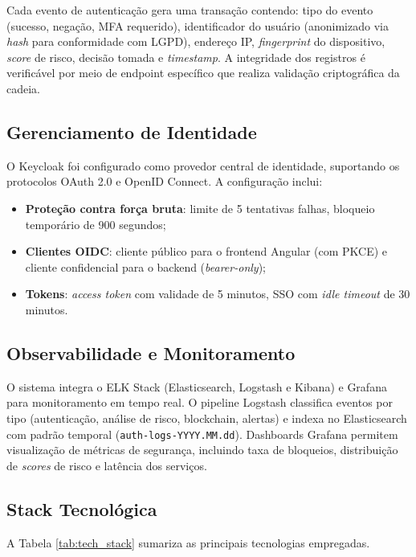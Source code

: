 \documentclass[12pt,a4paper]{article}
\begin{document}
Cada evento de autenticação gera uma transação contendo: tipo do evento (sucesso, negação, MFA requerido), identificador do usuário (anonimizado via \textit{hash} para conformidade com LGPD), endereço IP, \textit{fingerprint} do dispositivo, \textit{score} de risco, decisão tomada e \textit{timestamp}. A integridade dos registros é verificável por meio de endpoint específico que realiza validação criptográfica da cadeia.

\subsection{Gerenciamento de Identidade}

O Keycloak foi configurado como provedor central de identidade, suportando os protocolos OAuth 2.0 e OpenID Connect. A configuração inclui:

\begin{itemize}
    \item \textbf{Proteção contra força bruta}: limite de 5 tentativas falhas, bloqueio temporário de 900 segundos;
    \item \textbf{Clientes OIDC}: cliente público para o frontend Angular (com PKCE) e cliente confidencial para o backend (\textit{bearer-only});
    \item \textbf{Tokens}: \textit{access token} com validade de 5 minutos, SSO com \textit{idle timeout} de 30 minutos.
\end{itemize}

\subsection{Observabilidade e Monitoramento}

O sistema integra o ELK Stack (Elasticsearch, Logstash e Kibana) e Grafana para monitoramento em tempo real. O pipeline Logstash classifica eventos por tipo (autenticação, análise de risco, blockchain, alertas) e indexa no Elasticsearch com padrão temporal (\texttt{auth-logs-YYYY.MM.dd}). Dashboards Grafana permitem visualização de métricas de segurança, incluindo taxa de bloqueios, distribuição de \textit{scores} de risco e latência dos serviços.

\subsection{Stack Tecnológica}

A Tabela \ref{tab:tech_stack} sumariza as principais tecnologias empregadas.
\end{document}

